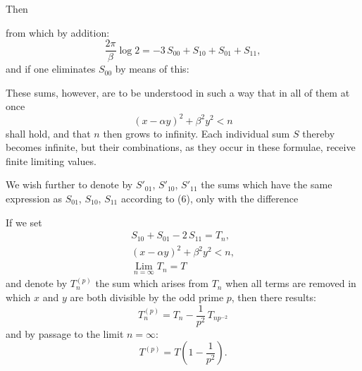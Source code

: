 
Then

from which by addition:
\[
\frac{2\pi}{\beta}\log 2 = -3\,S_{00} + S_{10} + S_{01} + S_{11},
\]
and if one eliminates $S_{00}$ by means of this:

These sums, however, are to be understood in such a way that in all of them at once
\[
(x-\alpha y)^2 + \beta^2 y^2 < n
\]
shall hold, and that $n$ then grows to infinity. Each individual sum $S$ thereby becomes
infinite, but their combinations, as they occur in these formulae, receive
finite limiting values.

We wish further to denote by $S'_{01}$, $S'_{10}$, $S'_{11}$ the sums which have the same
expression as $S_{01}$, $S_{10}$, $S_{11}$ according to (6), only with the difference 

If we set
\[
\begin{gathered}
S_{10} + S_{01} - 2\,S_{11} = T_n,\\
(x-\alpha y)^2 + \beta^2 y^2 < n,\\
\mathop{\mathrm{Lim}}\limits_{n=\infty} T_n = T
\end{gathered}
\]
and denote by $T_n^{(p)}$ the sum which arises from $T_n$ when all terms
are removed in which $x$ and $y$ are both divisible by the odd prime $p$, then
there results:
\[
T_n^{(p)} = T_n - \frac{1}{p^2}\,T_{np^{-2}}
\]
and by passage to the limit $n=\infty$:
\[
T^{(p)} = T\left(1 - \frac{1}{p^2}\right).
\]
